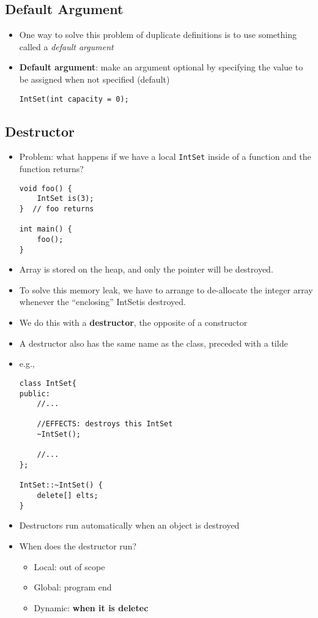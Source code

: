 \subsection{Default Argument}
\begin{itemize}
	\item One way to solve this problem of duplicate definitions is to use something called a \textit{default argument}
	\item \textbf{Default argument}: make an argument optional by specifying the value to be assigned when not specified (default)
\begin{lstlisting}[style=C++]
IntSet(int capacity = 0);
\end{lstlisting}
\end{itemize}

\subsection{Destructor}
\begin{itemize}
	\item Problem: what happens if we have a local \lstinline[style=C++]{IntSet} inside of a function and the function returns?
\begin{lstlisting}[style=C++]
void foo() {
	IntSet is(3);
}  // foo returns

int main() {
	foo();
}
\end{lstlisting}
	\item Array is stored on the heap, and only the pointer will be destroyed.
	\item To solve this memory leak, we have to arrange to de-allocate the integer array whenever the ``enclosing'' IntSetis destroyed.
	\item We do this with a \textbf{destructor}, the opposite of a constructor
	\item A destructor also has the same name as the class, preceded with a tilde
	\item e.g.,
\begin{lstlisting}[style=C++]
class IntSet{
public:
	//...

	//EFFECTS: destroys this IntSet
	~IntSet();

	//...
};

IntSet::~IntSet() {
	delete[] elts;
}
\end{lstlisting}
	\item Destructors run automatically when an object is destroyed
	\item When does the destructor run?
	\begin{itemize}
		\item Local: out of scope
		\item Global: program end
		\item Dynamic: \textbf{when it is deletec}
	\end{itemize}
\end{itemize}

